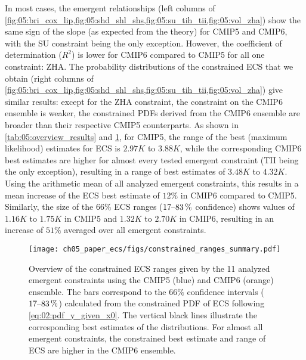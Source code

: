 In most cases, the emergent relationships (left columns of
\cref{fig:05:bri_cox_lip,fig:05:shd_shl_shs,fig:05:su_tih_tii,fig:05:vol_zha})
show the same sign of the slope (as expected from the theory) for \acs{CMIP}5
and \acs{CMIP}6, with the SU constraint being the only exception. However, the
coefficient of determination ($R^2$) is lower for \acs{CMIP}6 compared to
\acs{CMIP}5 for all one constraint: ZHA. The probability distributions of the
constrained \ac{ECS} that we obtain (right columns of
\cref{fig:05:bri_cox_lip,fig:05:shd_shl_shs,fig:05:su_tih_tii,fig:05:vol_zha})
give similar results: except for the ZHA constraint, the constraint on the
\acs{CMIP}6 ensemble is weaker, \ie{} the constrained \acp{PDF} derived from
the \acs{CMIP}6 ensemble are broader than their respective \acs{CMIP}5
counterparts. As shown in \cref{tab:05:overview_results} and
\cref{fig:05:overview_results}, for \acs{CMIP}5, the range of the best (maximum
likelihood) estimates for \acs{ECS} is $2.97 \unit{K}$ to $3.88 \unit{K}$,
while the corresponding \acs{CMIP}6 best estimates are higher for almost every
tested emergent constraint (TII being the only exception), resulting in a range
of best estimates of $3.48 \unit{K}$ to $4.32 \unit{K}$. Using the arithmetic
mean of all analyzed emergent constraints, this results in a mean increase of
the \ac{ECS} best estimate of $12 \unit{\%}$ in \acs{CMIP}6 compared to
\acs{CMIP}5. Similarly, the size of the $66 \unit{\%}$ \ac{ECS} ranges
($\rangeunit{17}{83}{\%}$ confidence) shows values of $1.16 \unit{K}$ to $1.75
\unit{K}$ in \acs{CMIP}5 and $1.32 \unit{K}$ to $2.70 \unit{K}$ in \acs{CMIP}6,
resulting in an increase of $51 \unit{\%}$ averaged over all emergent
constraints.

\begin{figure}[t]
  \centering
  \texttt{[image: 
    ch05\_paper\_ecs/figs/constrained\_ranges\_summary.pdf]}
  \caption[
    Overview of the constrained \acf{ECS} ranges given by the 11 emergent
    constraints using the \acs{CMIP}5 and \acs{CMIP}6 ensemble.
  ]{
    Overview of the constrained \acf{ECS} ranges given by the 11 analyzed
    emergent constraints using the \acs{CMIP}5 (blue) and \acs{CMIP}6 (orange)
    ensemble. The bars correspond to the $66 \unit{\%}$ confidence intervals
    ($\rangeunit{17}{83}{\%}$) calculated from the constrained \acl{PDF} of
    \acs{ECS} following \cref{eq:02:pdf_y_given_x0}. The vertical black lines
    illustrate the corresponding best estimates of the distributions. For
    almost all emergent constraints, the constrained best estimate and range of
    \acs{ECS} are higher in the \acs{CMIP}6 ensemble.
  }
  \label{fig:05:overview_results}
\end{figure}

